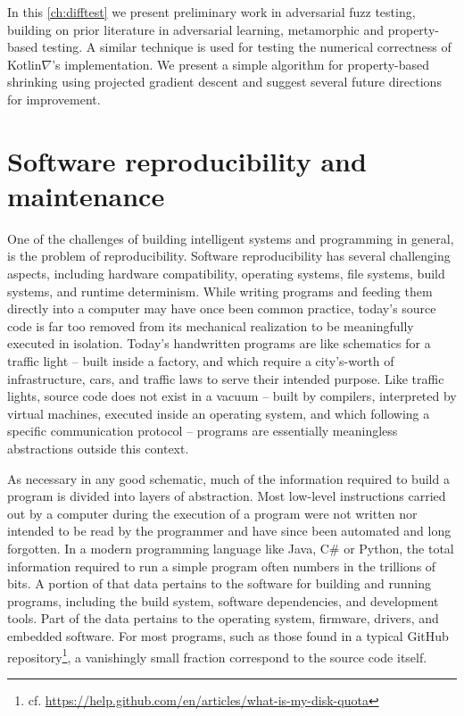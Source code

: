 \documentclass[12pt,initial,twoside,maitrise]{dms}
\numberwithin{equation}{section}
\numberwithin{table}{chapter}
\numberwithin{figure}{chapter}
\begin{document}
In this \autoref{ch:difftest} we present preliminary work in adversarial fuzz testing, building on prior literature in adversarial learning, metamorphic and property-based testing. A similar technique is used for testing the numerical correctness of Kotlin$\nabla$'s implementation. We present a simple algorithm for property-based shrinking using projected gradient descent and suggest several future directions for improvement.

\section{Software reproducibility and maintenance}

One of the challenges of building intelligent systems and programming in general, is the problem of reproducibility. Software reproducibility has several challenging aspects, including hardware compatibility, operating systems, file systems, build systems, and runtime determinism. While writing programs and feeding them directly into a computer may have once been common practice, today's source code is far too removed from its mechanical realization to be meaningfully executed in isolation. Today's handwritten programs are like schematics for a traffic light -- built inside a factory, and which require a city's-worth of infrastructure, cars, and traffic laws to serve their intended purpose. Like traffic lights, source code does not exist in a vacuum -- built by compilers, interpreted by virtual machines, executed inside an operating system, and which following a specific communication protocol -- programs are essentially meaningless abstractions outside this context.

As necessary in any good schematic, much of the information required to build a program is divided into layers of abstraction. Most low-level instructions carried out by a computer during the execution of a program were not written nor intended to be read by the programmer and have since been automated and long forgotten. In a modern programming language like Java, C\# or Python, the total information required to run a simple program often numbers in the trillions of bits. A portion of that data pertains to the software for building and running programs, including the build system, software dependencies, and development tools. Part of the data pertains to the operating system, firmware, drivers, and embedded software. For most programs, such as those found in a typical GitHub repository\footnote{cf. \url{https://help.github.com/en/articles/what-is-my-disk-quota}}, a vanishingly small fraction correspond to the source code itself.
\end{document}
